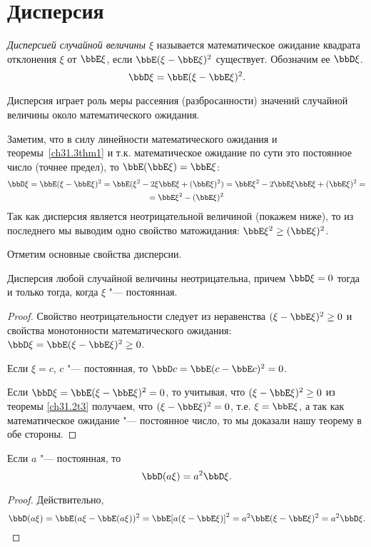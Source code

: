 \section{Дисперсия}
\begin{defn}
\textit{Дисперсией случайной величины $\xi$} называется математическое ожидание квадрата отклонения $\xi$ от $\bbE\xi$, если $\bbE(\xi-\bbE\xi)^2$ существует. Обозначим ее $\bbD\xi$. 
\begin{equation} \label{ch31.4eq1}
\bbD\xi=\bbE(\xi-\bbE\xi)^2.
\end{equation}
\end{defn}

Дисперсия играет роль меры рассеяния (разбросанности) значений случайной величины около математического ожидания.

Заметим, что в силу линейности математического ожидания и теоремы~\ref{ch31.3thm1}\; и т.к. математическое ожидание по сути это постоянное число (точнее предел), то $\bbE(\bbE\xi)=\bbE\xi$:
\begin{multline*}
\bbD\xi = \bbE(\xi-\bbE\xi)^2=\bbE(\xi^2-2\xi \bbE\xi+(\bbE\xi)^2)=\bbE\xi^2-2\bbE\xi \bbE\xi+(\bbE\xi)^2=\\=\bbE\xi^2-(\bbE\xi)^2
\end{multline*}
Так как дисперсия является неотрицательной величиной (покажем ниже), то из последнего мы выводим одно свойство матожидания: $\bbE\xi^2\ge(\bbE\xi)^2$.

Отметим основные свойства дисперсии.

\begin{thm} Дисперсия любой случайной величины неотрицательна, причем $\bbD\xi = 0$ тогда и только тогда, когда $\xi$ "--- постоянная. 
\end{thm}
\begin{proof}
Свойство неотрицательности следует из неравенства $(\xi - \bbE \xi)^2 \ge 0$ и свойства монотонности математического ожидания: $\bbD \xi = \bbE (\xi - \bbE \xi)^2 \ge 0$.

Если $\xi = c$, $c$ "--- постоянная, то $\bbD c = \bbE (c - \bbE c)^2 = 0$. 

Если $\bbD\xi=\bbE (\xi - \bbE \xi)^2=0$, то учитывая, что $(\xi - \bbE \xi)^2\ge 0$ из теоремы \ref{ch31.2t3} получаем, что $(\xi - \bbE \xi)^2=0$, т.е. $\xi=\bbE\xi$, а так как математическое ожидание "--- постоянное число, то мы доказали нашу теорему в обе стороны.
\end{proof}
\begin{thm} Если $a$ "--- постоянная, то $$\bbD(a\xi) = a^2 \bbD\xi.$$
\end{thm}
\begin{proof}
Действительно, 
\begin{equation*}
\bbD(a\xi) = \bbE(a\xi - \bbE (a\xi))^2 = \bbE [a (\xi - \bbE \xi)]^2 = a^2\bbE(\xi - \bbE\xi)^2 = a^2 \bbD\xi. \qedhere
\end{equation*}
\end{proof}

